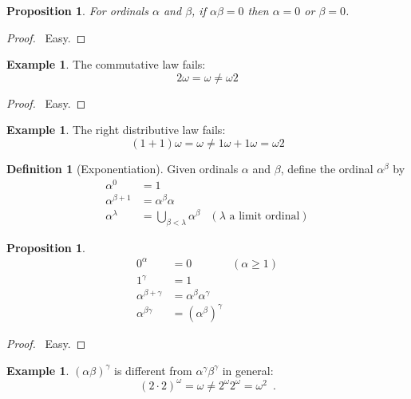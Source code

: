 \documentclass{report}
\let\qed\relax
\newtheorem{prop}[ax]{Proposition}
\theoremstyle{definition}
\newtheorem{df}[ax]{Definition}
\newtheorem{ex}[ax]{Example}
\begin{document}
\begin{prop}
For ordinals $\alpha$ and $\beta$, if $\alpha \beta = 0$ then $\alpha = 0$ or $\beta = 0$.
\end{prop}

\begin{proof}
\pf\ Easy. \qed
\end{proof}

\begin{ex}
The commutative law fails:
\[ 2 \omega = \omega \neq \omega 2 \]
\end{ex}

\begin{proof}
\pf\ Easy. \qed
\end{proof}

\begin{ex}
The right distributive law fails:
\[ (1 + 1) \omega = \omega \neq 1 \omega + 1 \omega = \omega 2 \]
\end{ex}

\begin{df}[Exponentiation]
Given ordinals $\alpha$ and $\beta$, define the ordinal $\alpha^\beta$ by
\begin{align*}
\alpha^0 & = 1 \\
\alpha^{\beta + 1} & = \alpha^\beta \alpha \\
\alpha^\lambda & = \bigcup_{\beta < \lambda} \alpha^\beta & (\lambda \text{ a limit ordinal})
\end{align*}
\end{df}

\begin{prop}
\begin{align*}
0^\alpha & = 0 & (\alpha \geq 1) \\
1^\gamma & = 1 \\
\alpha^{\beta + \gamma} & = \alpha^\beta \alpha^\gamma \\
\alpha^{\beta \gamma} & = (\alpha^\beta)^\gamma
\end{align*}
\end{prop}

\begin{proof}
\pf\ Easy. \qed
\end{proof}

\begin{ex}
$(\alpha \beta)^\gamma$ is different from $\alpha^\gamma \beta^\gamma$ in general:
\[ (2 \cdot 2)^\omega = \omega \neq 2^\omega 2^\omega = \omega^2 \enspace . \]
\end{ex}
\end{document}
